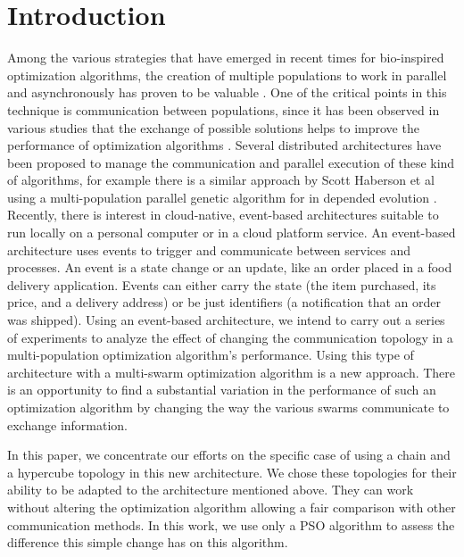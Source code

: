 \documentclass[runningheads]{llncs}
\begin{document}
\section{Introduction}

Among the various strategies that have emerged in recent times for bio-inspired
optimization algorithms, the creation of multiple populations to work in
parallel and asynchronously has proven to be valuable \cite{a1}.
One of the critical points in this technique is communication between populations, since it has been observed in various studies that the exchange of possible solutions helps to improve the performance of optimization algorithms \cite{a2}.
Several distributed architectures have been proposed to manage the communication and parallel execution of these kind of algorithms, for example there is a similar approach by Scott Haberson et al using a multi-population parallel genetic algorithm for in depended evolution \cite{da1}.
Recently, there is interest in cloud-native, event-based architectures suitable to run locally on a personal computer or in a cloud platform service. 
An event-based architecture uses events to trigger and communicate between services and processes. An event is a state change or an update, like an order placed in a food delivery application. Events can either carry the state (the item purchased, its price, and a delivery address) or be just identifiers (a notification that an order was shipped). Using an event-based architecture, we intend to carry out a series of experiments to analyze the effect of changing the communication topology in a multi-population optimization algorithm's performance. Using this type of architecture with a multi-swarm optimization algorithm is a new approach. There is an opportunity to find a substantial variation in the performance of such an optimization algorithm by changing the way the various swarms communicate to exchange information. 


In this paper, we concentrate our efforts on the specific case of using a chain and a hypercube topology in this new architecture. We chose these topologies for their ability to be adapted to the architecture mentioned above. They can work without altering the optimization algorithm allowing a fair comparison with other communication methods. In this work, we use only a PSO algorithm to assess the difference this simple change has on this algorithm.
\end{document}
